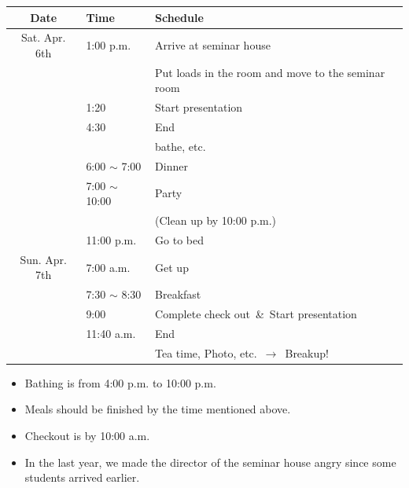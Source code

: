 \documentclass[unicode,a4paper,11pt]{ltjsarticle}
\begin{document}
\begin{center}
  \begin{tabular}{cll}\hline
    Date          & Time               & Schedule                                           \\ \hline
    Sat. Apr. 6th & 1:00 p.m.          & Arrive at seminar house                            \\
                  &                    & Put loads in the room and move to the seminar room \\
                  & 1:20               & Start presentation                                 \\
                  & 4:30               & End                                                \\
                  &                    & bathe, etc.                                        \\
                  & 6:00  $\sim$ 7:00  & Dinner                                             \\
                  & 7:00  $\sim$ 10:00 & Party                                              \\
                  &                    & (Clean up by 10:00 p.m.)                           \\
                  & 11:00 p.m.         & Go to bed                                          \\ \hline
    Sun. Apr. 7th & 7:00 a.m.          & Get up                                             \\
                  & 7:30 $\sim$  8:30  & Breakfast                                          \\
                  & 9:00               & Complete check out\ \&\ Start presentation         \\
                  & 11:40 a.m.         & End                                                \\
                  &                    & Tea time, Photo, etc.\ $\rightarrow$\ Breakup!     \\ \hline
  \end{tabular}
\end{center}

\begin{itemize}
  \item
        Bathing is from  4:00 p.m. to 10:00 p.m.
  \item
        Meals should be finished by the time mentioned above.
  \item
        Checkout is by 10:00 a.m.
  \item
        In the last year, we made the director of the seminar house angry since some students arrived earlier.
\end{itemize}
\end{document}
